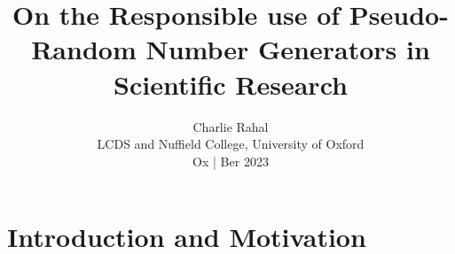 \documentclass[12pt]{beamer}
\begin{document}
\section{Introduction and Motivation}

\title{On the Responsible use of Pseudo-Random Number Generators in Scientific Research} \vspace{-0.25in}
\author{\footnotesize{Charlie Rahal\\ \vspace{0.05in} LCDS and Nuffield College, University of Oxford\\\vspace{.1in}Ox | Ber 2023}\\ \vspace{-0.15in}}
 \date{}
\end{document}
